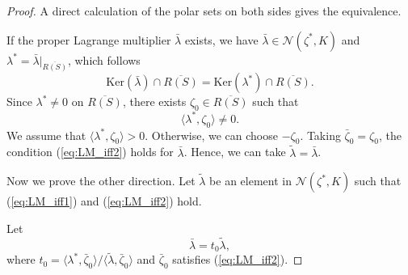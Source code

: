 \documentclass[10pt,a4paper]{amsart}
\begin{document}
\begin{proof}
A direct calculation of the polar sets on both sides gives the equivalence.

If the proper Lagrange multiplier $\bar{\lambda}$ exists, we have $\bar{\lambda} \in \mathcal{N}(\zeta^*,K)$ and $\lambda^* = \bar{\lambda}|_{\overline{R(S)}}$, which follows 
$$ \mathrm{Ker}(\bar{\lambda})\cap \overline{R(S)} = \mathrm{Ker}(\lambda^*)\cap \overline{R(S)}.$$
Since $\lambda^*\neq 0$ on $\overline{R(S)}$, there exists $\zeta_0\in \overline{R(S)}$ such that
$$\langle \lambda^*, \zeta_0\rangle \neq 0.$$
We assume that
$\langle \lambda^*, \zeta_0\rangle > 0.$
Otherwise, we can choose $-\zeta_0$. Taking $\bar{\zeta}_0 = \zeta_0$, the condition (\ref{eq:LM_iff2}) holds for $\bar{\lambda}$. 
Hence, we can take $\tilde{\lambda} = \bar{\lambda}$. 

Now we prove the other direction. 
Let $\tilde{\lambda}$ be an element in $\mathcal{N}(\zeta^*,K)$ such that (\ref{eq:LM_iff1}) and (\ref{eq:LM_iff2}) hold. 

Let  
$$ \bar{\lambda} = t_0\tilde{\lambda},$$
where $t_0 = \langle \lambda^*, \bar{\zeta}_0\rangle/\langle \tilde{\lambda}, \bar{\zeta}_0\rangle$ and $\bar{\zeta}_0$ satisfies (\ref{eq:LM_iff2}). 


\end{proof}
\end{document}
